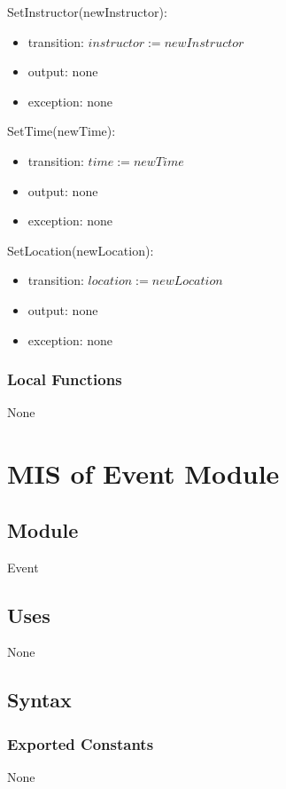 \documentclass[12pt, titlepage]{article}
\begin{document}
\noindent SetInstructor(newInstructor):
\begin{itemize}
\item transition: $instructor := newInstructor$
\item output: none
\item exception: none
\end{itemize}

\noindent SetTime(newTime):
\begin{itemize}
\item transition: $time := newTime$
\item output: none
\item exception: none
\end{itemize}

\noindent SetLocation(newLocation):
\begin{itemize}
\item transition: $location := newLocation$
\item output: none
\item exception: none
\end{itemize}
\subsubsection{Local Functions}

None

\newpage

\section{MIS of Event Module} \label{mEvent}

\subsection{Module}

Event

\subsection{Uses}

None

\subsection{Syntax}

\subsubsection{Exported Constants}
None
\end{document}
